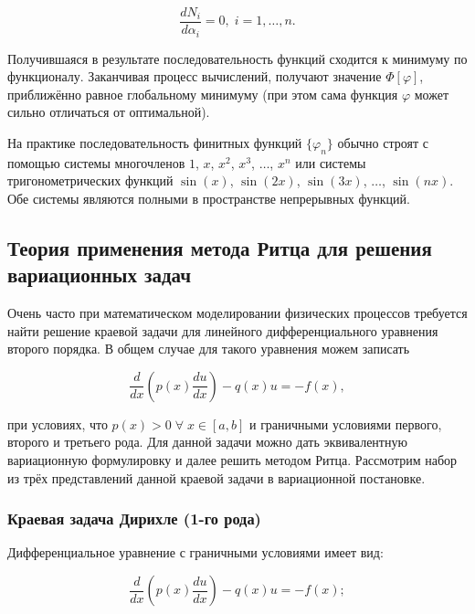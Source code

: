 \documentclass{article}
\begin{document}
\begin{displaymath}
	\frac{d N_{i}}{d\alpha_{i}} = 0, \; i = 1, \ldots, n.
\end{displaymath}

Получившаяся в результате последовательность функций сходится к минимуму по функционалу. Заканчивая процесс вычислений, получают значение $\Phi[\varphi]$, приближённо равное глобальному минимуму (при этом сама функция $\varphi$ может сильно отличаться от оптимальной).

На практике последовательность финитных функций ${\lbrace \varphi_{n} \rbrace}$ обычно строят с помощью системы многочленов $1$, $x$, $x^2$, $x^3$, $\ldots$, $x^n$ или системы тригонометрических функций $\sin (x)$, $\sin (2x)$, $\sin (3x)$, $\ldots$, $\sin (nx)$. Обе системы являются полными в пространстве непрерывных функций.

\subsection{Теория применения метода Ритца для решения вариационных задач}

Очень часто при математическом моделировании физических процессов требуется найти решение краевой задачи для линейного дифференциального уравнения второго порядка. В общем случае для такого уравнения можем записать

\begin{equation}\label{ODE_rank_2}
	\frac{d }{dx} \left( p(x) \frac{du}{dx} \right) - q(x)u = -f(x),
\end{equation}

\noindent при условиях, что $p(x) > 0 \; \forall \; x \in \left[ a, b \right]$ и граничными условиями первого, второго и третьего рода. Для данной задачи можно дать эквивалентную вариационную формулировку и далее решить методом Ритца.
Рассмотрим набор из трёх представлений данной краевой задачи в вариационной постановке.

\subsubsection{Краевая задача Дирихле (1-го рода)}

Дифференциальное уравнение с граничными условиями имеет вид:

\begin{displaymath}
	\frac{d }{dx} \left( p(x) \frac{du}{dx} \right) - q(x)u = -f(x);
\end{displaymath}
\end{document}
